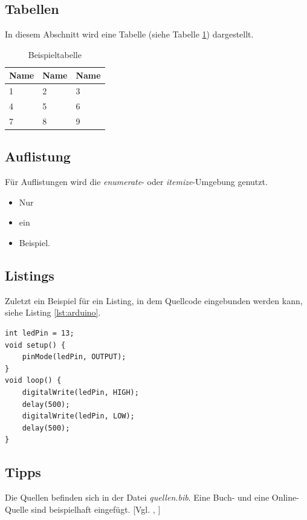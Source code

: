 \documentclass[12pt,a4paper]{article}
\begin{document}
\subsection{Tabellen}
In diesem Abschnitt wird eine Tabelle (siehe Tabelle \ref{tab:beispiel}) dargestellt.

\vspace{1em}
\begin{table}[!h]
	\centering
	\begin{tabular}{|l|l|l|}
		\hline
		\textbf{Name} & \textbf{Name} & \textbf{Name}\\
		\hline
		1 & 2 & 3\\
		\hline
		4 & 5 & 6\\
		\hline
		7 & 8 & 9\\
		\hline
	\end{tabular}
	\caption{Beispieltabelle}
	\label{tab:beispiel}
\end{table}


\subsection{Auflistung}
Für Auflistungen wird die \textit{enumerate}- oder \textit{itemize}-Umgebung genutzt.

\begin{itemize}
	\item Nur
	\item ein
	\item Beispiel.
\end{itemize}

\subsection{Listings}
Zuletzt ein Beispiel für ein Listing, in dem Quellcode eingebunden werden kann, siehe Listing \ref{lst:arduino}.

\vspace{1em}
\begin{lstlisting}[caption=Arduino Beispielprogramm, label=lst:arduino]
int ledPin = 13;
void setup() {
    pinMode(ledPin, OUTPUT);
}
void loop() {
    digitalWrite(ledPin, HIGH);
    delay(500);
    digitalWrite(ledPin, LOW);
    delay(500);
}
\end{lstlisting}

\subsection{Tipps}
Die Quellen befinden sich in der Datei \textit{quellen.bib}. Eine Buch- und eine Online-Quelle sind beispielhaft eingefügt. [Vgl. \cite{buch}, \cite{online}]
\end{document}

